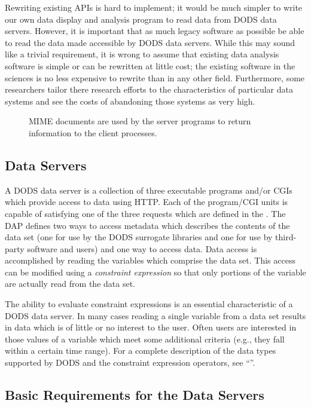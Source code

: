 Rewriting existing APIs is hard to implement; it would be much simpler to
write our own data display and analysis program to read data from DODS data
servers. However, it is important that as much legacy software as possible be
able to read the data made accessible by DODS data servers. While this may
sound like a trivial requirement, it is wrong to assume that existing data
analysis software is simple or can be rewritten at little cost; the existing
software in the sciences is no less expensive to rewrite than in any other
field. Furthermore, some researchers tailor there research efforts to the
characteristics of particular data systems and see the costs of abandoning
those systems as very high\cite{DODS:workshop1}.

\begin{figure}
\centerline{}
\caption{MIME documents are used by the server programs to return information
  to the client processes.}
\label{fig:data-transport}
\end{figure}

\subsection{Data Servers}
\label{ddd:data-servers}

A DODS data server is a collection of three executable programs and/or CGIs
which provide access to data using HTTP. Each of the program/CGI units is
capable of satisfying one of the three requests which are defined in the
\Dap. The DAP defines two ways to access metadata which describes the
contents of the data set (one for use by the DODS surrogate libraries and one
for use by third-party software and users) and one way to access data. Data
access is accomplished by reading the variables which comprise the data set.
This access can be modified using a {\em constraint expression\/} so that
only portions of the variable are actually read from the data set.

The ability to evaluate constraint expressions is an essential characteristic
of a DODS data server. In many cases reading a single variable from a data
set results in data which is of little or no interest to the user. Often
users are interested in those values of a variable which meet some additional
criteria (e.g., they fall within a certain time range). For a complete
description of the data types supported by DODS and the constraint expression
operators, see ``\DAP''.

\subsection{Basic Requirements for the Data Servers}

